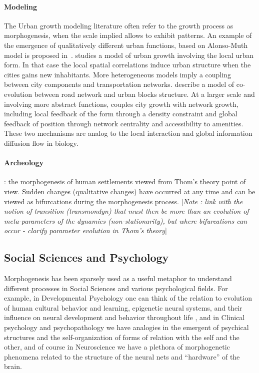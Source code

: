 \documentclass[fleqn,10pt]{wlscirep}
\begin{document}
\paragraph{Modeling}

The Urban growth modeling literature often refer to the growth process as morphogenesis, when the scale implied allows to exhibit patterns. An example of the emergence of qualitatively different urban functions, based on Alonso-Muth model is proposed in~\cite{bonin2012modele}. \cite{makse1998modeling} studies a model of urban growth involving the local urban form. In that case the local spatial correlations induce urban structure when the cities gains new inhabitants. More heterogeneous models imply a coupling between city components and transportation networks. \cite{achibet2014model} describe a model of co-evolution between road network and urban blocks structure. At a larger scale and involving more abstract functions, \cite{raimbault2014hybrid} couples city growth with network growth, including local feedback of the form through a density constraint and global feedback of position through network centrality and accessibility to amenities. These two mechanisms are analog to the local interaction and global information diffusion flow in biology.

\paragraph{Archeology}

\cite{renfrew1978trajectory} : the morphogenesis of human settlements viewed from Thom's theory point of view. Sudden changes (qualitative changes) have occurred at any time and can be viewed as bifurcations during the morphogenesis process. [\textit{Note : link with the notion of transition (transmondyn) that must then be more than an evolution of meta-parameters of the dynamics (non-stationarity), but where bifurcations can occur - clarify parameter evolution in Thom's theory}]




\subsection*{Social Sciences and Psychology}

Morphogenesis has been sparsely used as a useful metaphor to understand different processes in Social Sciences and various psychological fields. For example, in Developmental Psychology one can think of the relation to evolution of human cultural behavior and learning, epigenetic neural systems, and their influence on neural development and behavior throughout life , and in Clinical psychology and psychopathology we have analogies in the emergent of psychical structures and the self-organization of forms of relation with the self and the other, and of course in Neuroscience we have a plethora of morphogenetic phenomena related to  the structure of the neural nets and “hardware” of the brain.
\end{document}
